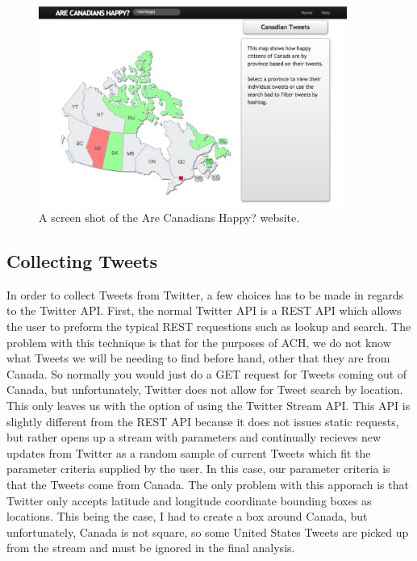 \documentclass[conference]{IEEEtran}
\begin{document}
\begin{figure}[tb!]
\centering
\includegraphics[width=0.9\textwidth]{images/website.png}
\caption{A screen shot of the Are Canadians Happy? website.\label{fig:website}}
\end{figure}

\subsection{Collecting Tweets}

In order to collect Tweets from Twitter, a few choices has to be made in regards to the Twitter API. First,
the normal Twitter API is a REST API which allows the user to preform the typical REST requestions such as 
lookup and search. The problem with this technique is that for the purposes of ACH, we do not know what Tweets
we will be needing to find before hand, other that they are from Canada. So normally you would just do a
GET request for Tweets coming out of Canada, but unfortunately, Twitter does not allow for Tweet search
by location. This only leaves us with the option of using the Twitter Stream API. This API is slightly different
from the REST API because it does not issues static requests, but rather opens up a stream with parameters and
continually recieves new updates from Twitter as a random sample of current Tweets which fit the parameter 
criteria supplied by the user. In this case, our parameter criteria is that the Tweets come from Canada. The
only problem with this apporach is that Twitter only accepts latitude and longitude coordinate bounding 
boxes as locations. This being the case, I had to create a box around Canada, but unfortunately, Canada is
not square, so some United States Tweets are picked up from the stream and must be ignored in the final
analysis.
\end{document}
